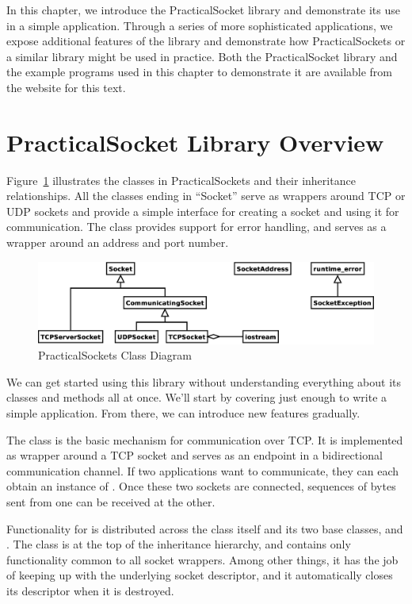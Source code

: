In this chapter, we introduce the PracticalSocket library and
demonstrate its use in a simple application.  Through a series of more
sophisticated applications, we expose additional features of the
library and demonstrate how PracticalSockets or a similar library
might be used in practice.  Both the PracticalSocket library and the
example programs used in this chapter to demonstrate it are available
from the website for this text.

\section{PracticalSocket Library Overview}

\noindent
Figure~\ref{fig:Inheritance} illustrates the classes in
PracticalSockets and their inheritance relationships.  All the classes
ending in ``Socket'' serve as wrappers around TCP or UDP sockets and
provide a simple interface for creating a socket and using it for
communication.  The  class provides support for
error handling, and  serves as a wrapper around an
address and port number.

\begin{figure}[htbp]
\includegraphics[width=5.5in]{figures/Inheritance.eps}
\caption{\label{fig:Inheritance}PracticalSockets Class Diagram}
\end{figure}

We can get started using this library without understanding everything
about its classes and methods all at once.  We'll start by covering
just enough to write a simple application.  From there, we can
introduce new features gradually.

The  class is the basic mechanism for communication
over TCP.  It is implemented as wrapper around a TCP socket and serves
as an endpoint in a bidirectional communication channel.  If two
applications want to communicate, they can each obtain an instance of
.  Once these two sockets are connected, sequences of
bytes sent from one can be received at the other.

Functionality for  is distributed across the class
itself and its two base classes,  and
.  The  class is at the top of the
inheritance hierarchy, and contains only functionality common to all
socket wrappers.  Among other things, it has the job of keeping up
with the underlying socket descriptor, and it automatically closes its
descriptor when it is destroyed.

